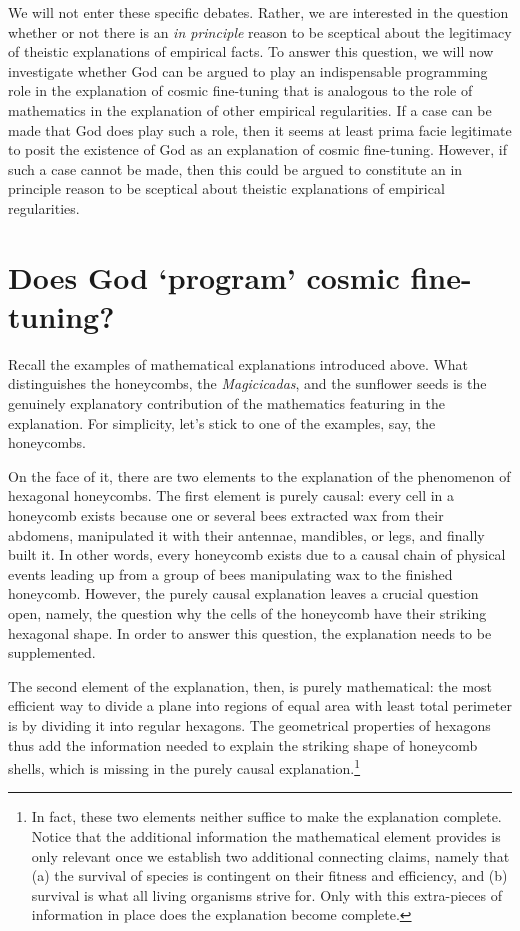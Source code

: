 \documentclass[a4paper,12pt]{article}
\begin{document}
We will not enter these specific debates. Rather, we are interested in the question whether or not there is an \textit{in principle} reason to be sceptical about the legitimacy of theistic explanations of empirical facts. To answer this question, we will now investigate whether God can be argued to play an indispensable programming role in the explanation of cosmic fine-tuning that is analogous to the role of mathematics in the explanation of other empirical regularities. If a case can be made that God does play such a role, then it seems at least prima facie legitimate to posit the existence of God as an explanation of cosmic fine-tuning. However, if such a case cannot be made, then this could be argued to constitute an in principle reason to be sceptical about theistic explanations of empirical regularities. 

\section{Does God `program' cosmic fine-tuning?}

Recall the examples of mathematical explanations introduced above. What distinguishes the honeycombs, the \textit{Magicicadas}, and the sunflower seeds is the genuinely explanatory contribution of the mathematics featuring in the explanation. For simplicity, let's stick to one of the examples, say, the honeycombs.

On the face of it, there are two elements to the explanation of the phenomenon of hexagonal honeycombs. The first element is purely causal: every cell in a honeycomb exists because one or several bees extracted wax from their abdomens, manipulated it with their antennae, mandibles, or legs, and finally built it. In other words, every honeycomb exists due to a causal chain of physical events leading up from a group of bees manipulating wax to the finished honeycomb. However, the purely causal explanation leaves a crucial question open, namely, the question why the cells of the honeycomb have their striking hexagonal shape. In order to answer this question, the explanation needs to be supplemented.

The second element of the explanation, then, is purely mathematical: the most efficient way to divide a plane into regions of equal area with least total perimeter is by dividing it into regular hexagons. The geometrical properties of hexagons thus add the information needed to explain the striking shape of honeycomb shells, which is missing in the purely causal explanation.\footnote{In fact, these two elements neither suffice to make the explanation complete. Notice that the additional information the mathematical element provides is only relevant once we establish two additional connecting claims, namely that (a) the survival of species is contingent on their fitness and efficiency, and (b) survival is what all living organisms strive for. Only with this extra-pieces of information in place does the explanation become complete.}
\end{document}
